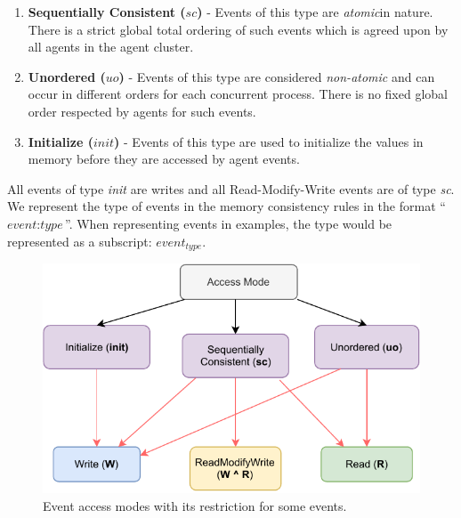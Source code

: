         \begin{enumerate}
            \item \textbf{Sequentially Consistent ($sc$)} - Events of this type are \textit{atomic}\footnotemark  in nature. There is a strict global total ordering of such events which is agreed upon by all agents in the agent cluster. 
            
            \item \textbf{Unordered ($uo$)} - Events of this type are considered \textit{non-atomic} and can occur in different orders for each concurrent process. There is no fixed global order respected by agents for such events. 
            
            \item \textbf{Initialize ($init$)} - Events of this type are used to initialize the values in memory before they are accessed by agent events. 
        \end{enumerate}

        All events of type \textit{init} are writes and all Read-Modify-Write events are of type \textit{sc}.  
        We represent the type of events in the memory consistency rules in the format ``$\textit{event} : \textit{type}$''. 
        When representing events in examples, the type would be represented as a subscript: $\textit{event}_\textit{type}$. 
       
        \begin{figure}[H]
            \centering
            \includegraphics[scale=0.7]{4.ECMAScriptMemoryModel/AccessModes.pdf}
            \caption{Event access modes with its restriction for some events.}
        \end{figure}


